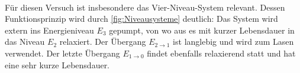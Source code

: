             \\
            Für diesen Versuch ist insbesondere das Vier-Niveau-System relevant.
            Dessen Funktionsprinzip wird durch \autoref{fig:Niveausysteme} deutlich:
            Das System wird extern ins Energieniveau $E_3$ gepumpt, von wo aus es mit kurzer Lebensdauer in das Niveau $E_2$ relaxiert.
            Der Übergang $E_{2\rightarrow 1}$ ist langlebig und wird zum Lasen verwendet. 
            Der letzte Übergang $E_{1\rightarrow 0}$ findet ebenfalls relaxierend statt und hat eine sehr kurze Lebensdauer.
            \\
